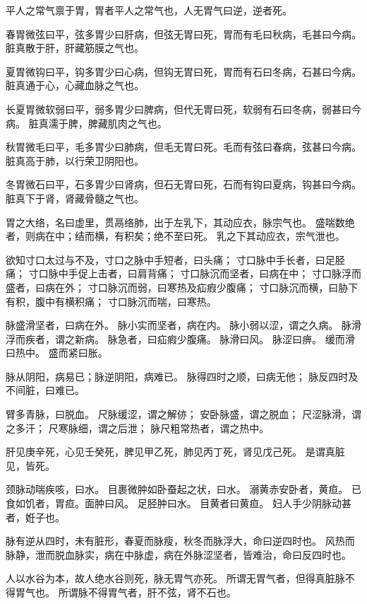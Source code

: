 \documentclass{article}%
\begin{document}
平人之常气禀于胃，胃者平人之常气也，人无胃气曰逆，逆者死。

春胃微弦曰平，弦多胃少曰肝病，但弦无胃曰死，胃而有毛曰秋病，毛甚曰今病。
脏真散于肝，肝藏筋膜之气也。

夏胃微钩曰平，钩多胃少曰心病，但钩无胃曰死，胃而有石曰冬病，石甚曰今病。
脏真通于心，心藏血脉之气也。

长夏胃微软弱曰平，弱多胃少曰脾病，但代无胃曰死，软弱有石曰冬病，弱甚曰今病。
脏真濡于脾，脾藏肌肉之气也。

秋胃微毛曰平，毛多胃少曰肺病，但毛无胃曰死。毛而有弦曰春病，弦甚曰今病。
脏真高于肺，以行荣卫阴阳也。

冬胃微石曰平，石多胃少曰肾病，但石无胃曰死，石而有钩曰夏病，钩甚曰今病。
脏真下于肾，肾藏骨髓之气也。

胃之大络，名曰虚里，贯鬲络肺，出于左乳下，其动应衣，脉宗气也。
盛喘数绝者，则病在中；结而横，有积矣；绝不至曰死。
乳之下其动应衣，宗气泄也。

欲知寸口太过与不及，寸口之脉中手短者，曰头痛；
寸口脉中手长者，曰足胫痛；
寸口脉中手促上击者，曰肩背痛；
寸口脉沉而坚者，曰病在中；
寸口脉浮而盛者，曰病在外；
寸口脉沉而弱，曰寒热及疝瘕少腹痛；
寸口脉沉而横，曰胁下有积，腹中有横积痛；
寸口脉沉而喘，曰寒热。

脉盛滑坚者，曰病在外。
脉小实而坚者，病在内。
脉小弱以涩，谓之久病。
脉滑浮而疾者，谓之新病。
脉急者，曰疝瘕少腹痛。
脉滑曰风。
脉涩曰痹。
缓而滑曰热中。
盛而紧曰胀。

脉从阴阳，病易已；脉逆阴阳，病难已。
脉得四时之顺，曰病无他；
脉反四时及不间脏，曰难已。

臂多青脉，曰脱血。
尺脉缓涩，谓之解㑊；
安卧脉盛，谓之脱血；
尺涩脉滑，谓之多汗；
尺寒脉细，谓之后泄；
脉尺粗常热者，谓之热中。

肝见庚辛死，心见壬癸死，脾见甲乙死，肺见丙丁死，肾见戊己死。
是谓真脏见，皆死。

颈脉动喘疾咳，曰水。
目裹微肿如卧蚕起之状，曰水。
溺黄赤安卧者，黄疸。
已食如饥者，胃疸。面肿曰风。
足胫肿曰水。
目黄者曰黄疸。
妇人手少阴脉动甚者，姙子也。

脉有逆从四时，未有脏形，春夏而脉瘦，秋冬而脉浮大，命曰逆四时也。
风热而脉静，泄而脱血脉实，病在中脉虚，病在外脉涩坚者，皆难治，命曰反四时也。

人以水谷为本，故人绝水谷则死，脉无胃气亦死。
所谓无胃气者，但得真脏脉不得胃气也。
所谓脉不得胃气者，肝不弦，肾不石也。
\end{document}
